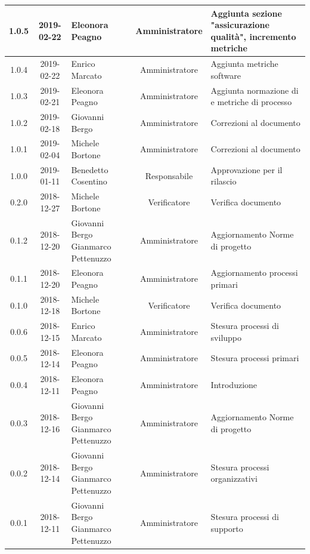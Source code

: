\documentclass[11pt,a4paper]{article}
\begin{document}
{\begin{tabularx}{\textwidth}{ c | c | p{3.80cm} | c | X }
		1.0.5 & 2019-02-22 & Eleonora Peagno & Amministratore & Aggiunta sezione "assicurazione qualità", incremento metriche \\ \hline
		1.0.4 & 2019-02-22 & Enrico Marcato & Amministratore & Aggiunta metriche software \\ \hline
		1.0.3 & 2019-02-21 & Eleonora Peagno & Amministratore & Aggiunta normazione di e metriche di processo \\ \hline
		1.0.2 & 2019-02-18 & Giovanni Bergo & Amministratore & Correzioni al documento \\ \hline
		1.0.1 & 2019-02-04 & Michele Bortone & Amministratore & Correzioni al documento \\ \hline
		1.0.0 & 2019-01-11 & Benedetto Cosentino & Responsabile & Approvazione per il rilascio \\ \hline
		0.2.0 & 2018-12-27 & Michele Bortone & Verificatore & Verifica documento \\ \hline
		0.1.2 & 2018-12-20 & Giovanni Bergo \newline Gianmarco Pettenuzzo & Amministratore & Aggiornamento Norme di progetto \\ \hline
		0.1.1 & 2018-12-20 & Eleonora Peagno & Amministratore & Aggiornamento processi primari \\ \hline
		0.1.0 & 2018-12-18 & Michele Bortone & Verificatore & Verifica documento \\ \hline
		0.0.6 & 2018-12-15 & Enrico Marcato & Amministratore & Stesura processi di \newline sviluppo \\ \hline
		0.0.5 & 2018-12-14 & Eleonora Peagno & Amministratore & Stesura processi primari \\ \hline
		0.0.4 & 2018-12-11 & Eleonora Peagno & Amministratore & Introduzione \\ \hline
		0.0.3 & 2018-12-16 & Giovanni Bergo \newline Gianmarco Pettenuzzo & Amministratore & Aggiornamento Norme di progetto \\ \hline
		0.0.2 & 2018-12-14 & Giovanni Bergo \newline Gianmarco Pettenuzzo & Amministratore & Stesura processi \newline organizzativi \\ \hline
		0.0.1 & 2018-12-11 & Giovanni Bergo \newline Gianmarco Pettenuzzo & Amministratore & Stesura processi di \newline supporto \\ \hline		
	\end{tabularx}
	
}
\end{document}

